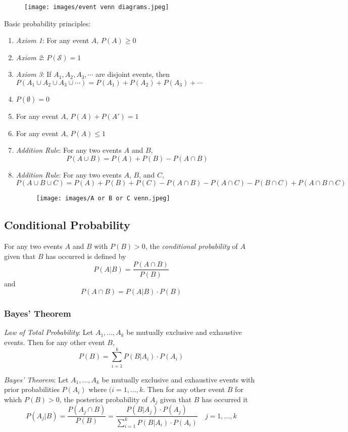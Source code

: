 \documentclass{article}
\begin{document}
\begin{figure}[H]
    \centering
    \texttt{[image: images/event venn diagrams.jpeg]}
\end{figure}

Basic probability principles:

\begin{enumerate}
    \item \textit{Axiom 1}: For any event $A$, $P(A) \geq 0$
    \item \textit{Axiom 2}: $P(\mathcal{S}) = 1$
    \item \textit{Axiom 3}: If $A_1, A_2, A_3, \cdots$ are disjoint events, then $P(A_1 \cup A_2 \cup A_3 \cup \cdots) = P(A_1) + P(A_2) + P(A_3) + \cdots$
    \item $P(\emptyset) = 0$
    \item For any event $A$, $P(A) + P(A') = 1$
    \item For any event $A$, $P(A) \leq 1$
    \item \textit{Addition Rule}: For any two events $A$ and $B$,
    $$ P(A \cup B) = P(A) + P(B) - P(A \cap B) $$
    \item \textit{Addition Rule}: For any two events $A$, $B$, and $C$,
    $$ P(A \cup B \cup C) = P(A) + P(B) + P(C) - P(A \cap B) - P(A \cap C) - P(B \cap C) + P(A \cap B \cap C) $$
    \begin{figure}[H]
        \centering
        \texttt{[image: images/A or B or C venn.jpeg]}
    \end{figure}
\end{enumerate}

\subsection*{Conditional Probability}
For any two events $A$ and $B$ with $P(B)>0$, the \textit{conditional probability} of $A$ given that $B$ has occurred is defined by
$$ P(A|B) = \frac{P(A \cap B)}{P(B)} $$
and
$$ P(A \cap B) = P(A|B) \cdot P(B) $$

\subsubsection*{Bayes' Theorem}
\textit{Law of Total Probability}: Let $A_1, ..., A_k$ be mutually exclusive and exhaustive events. Then for any other event $B$,
$$ P(B) = \sum^k_{i=1} P(B|A_i) \cdot P(A_i) $$

\textit{Bayes' Theorem}: Let $A_1, ..., A_k$ be mutually exclusive and exhaustive events with prior probabilities $P(A_i)$ where $(i = 1, ..., k$. Then for any other event $B$ for which $P(B) > 0$, the posterior probability of $A_j$ given that $B$ has occurred it
$$ P(A_j|B) = \frac{P(A_j \cap B)}{P(B)} = \frac{P(B|A_j) \cdot P(A_j)}{\sum^k_{i=1} P(B|A_i) \cdot P(A_i)} \quad j = 1, ..., k $$
\end{document}
